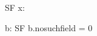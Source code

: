 \documentclass{article}
\begin{document}
\begin{zdirectives}
\end{zdirectives}

\begin{schema}{SF}
  x: \nat
\end{schema}
\begin{axdef}
  b: SF
\where
  b.nosuchfield = 0
\end{axdef}
\end{document}

